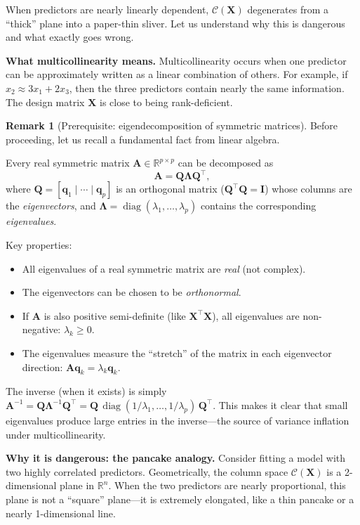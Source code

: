 \documentclass[11pt,a4paper]{article}
\theoremstyle{plain}
\theoremstyle{definition}
\newtheorem{remark}[theorem]{Remark}
\newcommand{\R}{\mathbb{R}}
\newcommand{\bX}{\bm{X}}
\newcommand{\bI}{\bm{I}}
\newcommand{\bQ}{\bm{Q}}
\newcommand{\Col}{\mathcal{C}}
\DeclareMathOperator{\diag}{diag}
\begin{document}
When predictors are nearly linearly dependent, $\Col(\bX)$ degenerates
from a ``thick'' plane into a paper-thin sliver.
Let us understand why this is dangerous and what exactly goes wrong.

\medskip
\noindent\textbf{What multicollinearity means.}
Multicollinearity occurs when one predictor can be approximately written as a linear combination of others.
For example, if $x_2 \approx 3x_1 + 2x_3$, then the three predictors contain nearly the same information.
The design matrix $\bX$ is close to being rank-deficient.

\medskip
\begin{remark}[Prerequisite: eigendecomposition of symmetric matrices]
Before proceeding, let us recall a fundamental fact from linear algebra.

Every real symmetric matrix $\bm{A} \in \R^{p \times p}$ can be
decomposed as
\[
  \bm{A} = \bQ \bm{\Lambda} \bQ^\top,
\]
where $\bQ = [\bm{q}_1 \mid \cdots \mid \bm{q}_p]$ is an orthogonal
matrix ($\bQ^\top \bQ = \bI$) whose columns are the \emph{eigenvectors},
and $\bm{\Lambda} = \diag(\lambda_1, \dots, \lambda_p)$ contains the
corresponding \emph{eigenvalues}.

Key properties:
\begin{itemize}[nosep]
  \item All eigenvalues of a real symmetric matrix are \emph{real}
        (not complex).
  \item The eigenvectors can be chosen to be \emph{orthonormal}.
  \item If $\bm{A}$ is also positive semi-definite (like $\bX^\top\bX$),
        all eigenvalues are non-negative: $\lambda_k \ge 0$.
  \item The eigenvalues measure the ``stretch'' of the matrix in each
        eigenvector direction: $\bm{A}\bm{q}_k = \lambda_k \bm{q}_k$.
\end{itemize}

The inverse (when it exists) is simply
$\bm{A}^{-1} = \bQ \bm{\Lambda}^{-1} \bQ^\top
= \bQ \, \diag(1/\lambda_1, \dots, 1/\lambda_p) \, \bQ^\top$.
This makes it clear that small eigenvalues produce large entries in the
inverse---the source of variance inflation under multicollinearity.
\end{remark}

\medskip
\noindent\textbf{Why it is dangerous: the pancake analogy.}
Consider fitting a model with two highly correlated predictors.
Geometrically, the column space $\Col(\bX)$ is a 2-dimensional plane in $\R^n$.
When the two predictors are nearly proportional, this plane is not a ``square'' plane---it is extremely elongated, like a thin pancake or a nearly 1-dimensional line.
\end{document}
